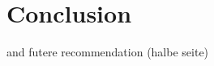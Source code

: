 \documentclass[5p,times,procedia]{elsarticle}
\newenvironment{note}{%
	\noindent
    \color{notecolor}%
}{%
    \par\medskip%
}
\begin{document}
\section{Conclusion}
\begin{note}
	and futere recommendation (halbe seite)
	
\end{note}





\end{document}

